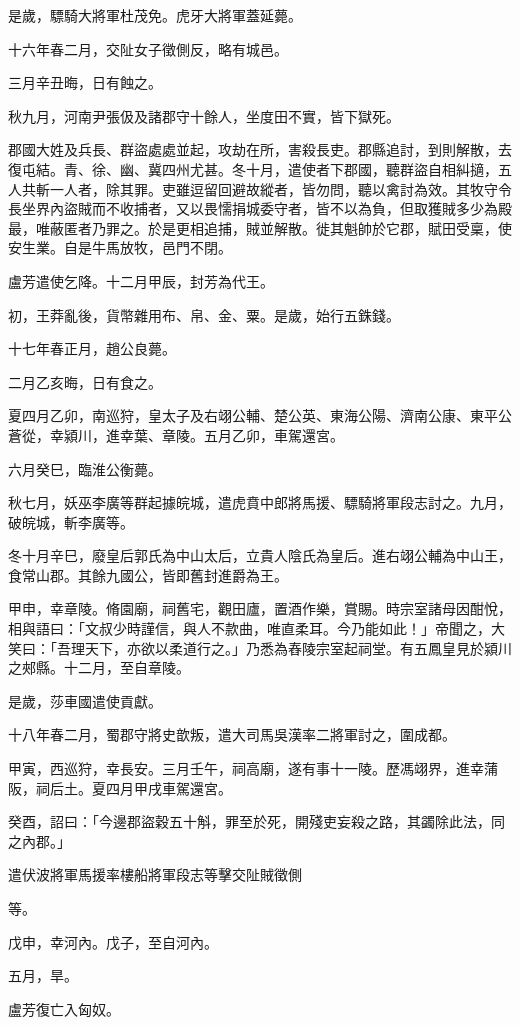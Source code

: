 \begin{pinyinscope}
是歲，驃騎大將軍杜茂免。虎牙大將軍蓋延薨。

十六年春二月，交阯女子徵側反，略有城邑。

三月辛丑晦，日有蝕之。

秋九月，河南尹張伋及諸郡守十餘人，坐度田不實，皆下獄死。

郡國大姓及兵長、群盜處處並起，攻劫在所，害殺長吏。郡縣追討，到則解散，去復屯結。青、徐、幽、冀四州尤甚。冬十月，遣使者下郡國，聽群盜自相糾擿，五人共斬一人者，除其罪。吏雖逗留回避故縱者，皆勿問，聽以禽討為效。其牧守令長坐界內盜賊而不收捕者，又以畏懦捐城委守者，皆不以為負，但取獲賊多少為殿最，唯蔽匿者乃罪之。於是更相追捕，賊並解散。徙其魁帥於它郡，賦田受稟，使安生業。自是牛馬放牧，邑門不閉。

盧芳遣使乞降。十二月甲辰，封芳為代王。

初，王莽亂後，貨幣雜用布、帛、金、粟。是歲，始行五銖錢。

十七年春正月，趙公良薨。

二月乙亥晦，日有食之。

夏四月乙卯，南巡狩，皇太子及右翊公輔、楚公英、東海公陽、濟南公康、東平公蒼從，幸潁川，進幸葉、章陵。五月乙卯，車駕還宮。

六月癸巳，臨淮公衡薨。

秋七月，妖巫李廣等群起據皖城，遣虎賁中郎將馬援、驃騎將軍段志討之。九月，破皖城，斬李廣等。

冬十月辛巳，廢皇后郭氏為中山太后，立貴人陰氏為皇后。進右翊公輔為中山王，食常山郡。其餘九國公，皆即舊封進爵為王。

甲申，幸章陵。脩園廟，祠舊宅，觀田廬，置酒作樂，賞賜。時宗室諸母因酣悅，相與語曰：「文叔少時謹信，與人不款曲，唯直柔耳。今乃能如此！」帝聞之，大笑曰：「吾理天下，亦欲以柔道行之。」乃悉為舂陵宗室起祠堂。有五鳳皇見於潁川之郟縣。十二月，至自章陵。

是歲，莎車國遣使貢獻。

十八年春二月，蜀郡守將史歆叛，遣大司馬吳漢率二將軍討之，圍成都。

甲寅，西巡狩，幸長安。三月壬午，祠高廟，遂有事十一陵。歷馮翊界，進幸蒲阪，祠后土。夏四月甲戌車駕還宮。

癸酉，詔曰：「今邊郡盜穀五十斛，罪至於死，開殘吏妄殺之路，其蠲除此法，同之內郡。」

遣伏波將軍馬援率樓船將軍段志等擊交阯賊徵側

等。

戊申，幸河內。戊子，至自河內。

五月，旱。

盧芳復亡入匈奴。


\end{pinyinscope}
